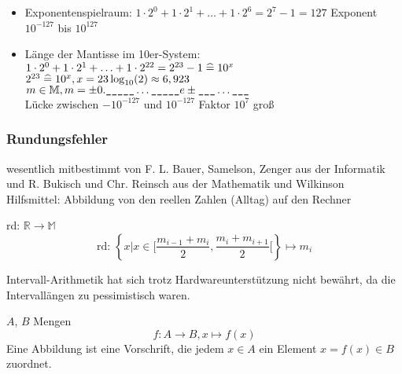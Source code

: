 \begin{itemize}
 \item Exponentenspielraum: $1\cdot 2^0+1\cdot2^1+\ldots+1\cdot2^6 = 2^7 -1 = 127$
  Exponent $10^{-127}$ bis $10^{127}$
 \item Länge der Mantisse im 10er-System:\\
$1\cdot 2^0+1\cdot2^1+\ldots+1\cdot2^{22}=2^{23}-1 \mathrel{\widehat{=}} 10^x$\\
$2^{23}\mathrel{\widehat{=}} 10^x, x=23 \log_{10}(2) \approx 6,923 $\\
$m \in \mathbb{M}, m=\pm 0.\text{\ttfamily\_\_\_\_\_}\ldots\text{\ttfamily\_\_\_\_\_} e\pm \text{\ttfamily\_\_\_}\ldots\text{\ttfamily\_\_\_}$\\Lücke zwischen $-10^{-127}$ und $10^{-127}$ Faktor $10^7$ groß
\end{itemize}

\subsubsection*{Rundungsfehler}

wesentlich mitbestimmt von F. L. Bauer, Samelson, Zenger aus der Informatik und R. Bukisch und Chr. Reinsch aus der Mathematik und Wilkinson\\
Hilfsmittel: Abbildung von den reellen Zahlen (Alltag) auf den Rechner

\begin{definition}
rd: $\mathbb{R}\rightarrow\mathbb{M}$\\
\[ \text{rd: } \left\{x|x \in [\frac{m_{i-1}+m_i}{2},\frac{m_{i}+m_{i+1}}{2}[\right\} \mapsto m_i \]
\end{definition}

\begin{note}
Intervall-Arithmetik hat sich trotz Hardwareunterstützung nicht bewährt, da die Intervallängen zu pessimistisch waren.
\end{note}

\begin{definition}[Abbildung] $A$, $B$ Mengen
\begin{equation*}f: A \rightarrow B, x \mapsto f(x)\end{equation*}
Eine Abbildung ist eine Vorschrift, die jedem $x \in A$ ein Element $x=f(x) \in B$ zuordnet.
\end{definition}

